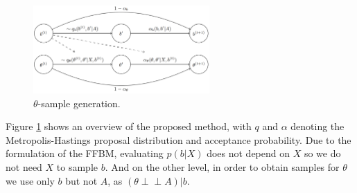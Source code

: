 \begin{figure}[!ht]
	\centering

%		
%		
%		
%		
	\includegraphics[width=0.6\textwidth]{img/sampling-sequence}
	\caption{$\theta$-sample generation.}
	\label{fig:samp-sequence}
\end{figure}
 
Figure \ref{fig:samp-sequence} shows an overview of the proposed method, with $q$ and $\alpha$ denoting the Metropolis-Hastings proposal distribution and acceptance probability.
Due to the formulation of the FFBM, evaluating $p(b| X)$ does not depend on $X$ so
we do not need $X$ to sample $b$.
And on the other level, in order to obtain 
samples for $\theta$
we use only $b$ but not $A$, as $(\theta \perp \!\!\! \perp A )| b$. 

